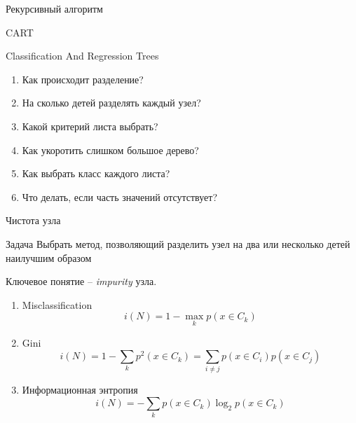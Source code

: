 \documentclass[aspectratio=169]{beamer}
\begin{document}

\begin{frame}{Рекурсивный алгоритм}

\dt

\end{frame}

\begin{frame}{CART}

Classification And Regression Trees

\begin{enumerate}
\item Как происходит разделение?
\item На сколько детей разделять каждый узел?
\item Какой критерий листа выбрать?
\item Как укоротить слишком большое дерево?
\item Как выбрать класс каждого листа?
\item Что делать, если часть значений отсутствует?
\end{enumerate}

\end{frame}

\begin{frame}{Чистота узла}

\begin{block}{Задача}
Выбрать метод, позволяющий разделить узел на два или несколько детей наилучшим образом
\end{block}

\vspace{1em}
Ключевое понятие -- {\it impurity} узла.
\begin{enumerate}
\item Misclassification
\[
i(N) = 1 - \max_k p(x \in C_k)
\]
\item Gini
\[
i(N) = 1 - \sum_k p^2(x \in C_k) = \sum_{i \neq j} p(x \in C_i) p(x \in C_j)
\]
\item Информационная энтропия
\[
i(N) =  -\sum_k p(x \in C_k) \log_2 p(x \in C_k)
\]
\end{enumerate}

\end{frame}
\end{document}
